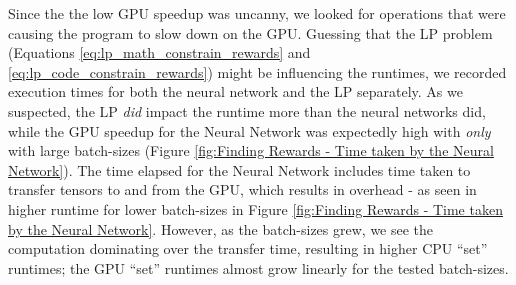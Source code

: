 \documentclass[12pt]{article}
\begin{document}
    Since the the low GPU speedup was uncanny, we looked for operations that were causing the program to slow down on the GPU. Guessing that the LP problem (Equations \ref{eq:lp_math_constrain_rewards} and \ref{eq:lp_code_constrain_rewards}) might be influencing the runtimes, we recorded execution times for both the neural network and the LP separately. As we suspected, the LP \textit{did} impact the runtime more than the neural networks did, while the GPU speedup for the Neural Network was expectedly high with \textit{only} with large batch-sizes (Figure \ref{fig:Finding Rewards - Time taken by the Neural Network}). The time elapsed for the Neural Network includes time taken to transfer tensors to and from the GPU, which results in overhead - as seen in higher runtime for lower batch-sizes in Figure \ref{fig:Finding Rewards - Time taken by the Neural Network}. However, as the batch-sizes grew, we see the computation dominating over the transfer time, resulting in higher CPU ``set'' runtimes; the GPU ``set'' runtimes almost grow linearly for the tested batch-sizes.
\end{document}
